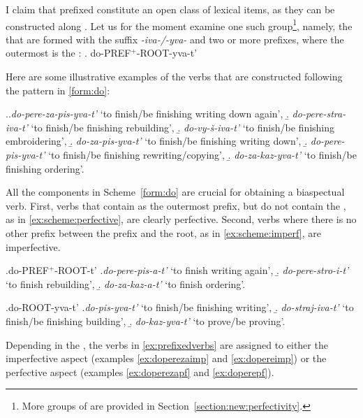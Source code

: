 I claim that prefixed  constitute an open class of lexical items, as they can be constructed along . Let us for the moment examine one such group\footnote{More groups of  are provided in Section~\ref{section:new:perfectivity}.}, namely, the  that are formed with the suffix \textit{-iva-/-yva-} and two or more prefixes, where the outermost is the :
\ex. \label{form:do}do-PREF$^{+}$-ROOT-yva-t'

Here are some illustrative examples of the verbs that are constructed following the pattern in \ref{form:do}:\largerpage[-1]

\ex.\label{ex:prefixedverbs}\a.\textit{do-pere-za-pis-yva-t'} `to finish/be finishing writing down again', 
\b. \textit{do-pere-stra-iva-t'} `to finish/be finishing rebuilding',
\b. \textit{do-vy-\v{s}-iva-t'} `to finish/be finishing embroidering',
\b. \textit{do-za-pis-yva-t'} `to finish/be finishing writing down', 
\b. \textit{do-pere-pis-yva-t'} `to finish/be finishing rewriting/copying', 
\b. \textit{do-za-kaz-yva-t'} `to finish/be finishing ordering'.

All the components in Scheme~\ref{form:do} are crucial for obtaining a biaspectual verb. First, verbs that contain  as the outermost prefix, but do not contain the , as in \ref{ex:scheme:perfective}, are clearly perfective. Second, verbs where there is no other prefix between the prefix  and the root, as in \ref{ex:scheme:imperf}, are imperfective.

\ex.\label{ex:scheme:perfective}do-PREF$^{+}$-ROOT-t'
\a.\textit{do-pere-pis-a-t'}\textsuperscript{\PF} `to finish writing again', 
\b. \textit{do-pere-stro-i-t'}\textsuperscript{\PF} `to finish rebuilding',
\b. \textit{do-za-kaz-a-t'}\textsuperscript{\PF} `to finish ordering'.

\ex.\label{ex:scheme:imperf}do-ROOT-yva-t'
\a.\textit{do-pis-yva-t'}\textsuperscript{\IPF} `to finish/be finishing writing', 
\b. \textit{do-straj-iva-t'}\textsuperscript{\IPF} `to finish/be finishing building',
\b. \textit{do-kaz-yva-t'}\textsuperscript{\IPF} `to prove/be proving'.

Depending in the , the verbs in \ref{ex:prefixedverbs} are assigned to either the imperfective aspect (examples \ref{ex:doperezaimp} and \ref{ex:dopereimp}) or the perfective aspect (examples \ref{ex:doperezapf} and \ref{ex:doperepf}). 

